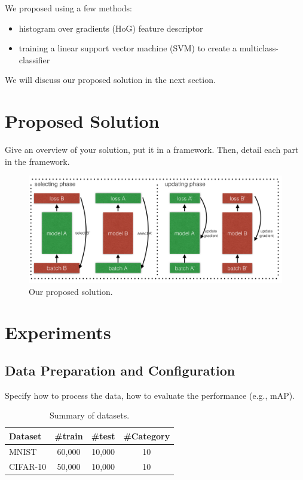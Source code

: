 \documentclass[11pt]{article}
\begin{document}
We proposed using a few methods:

\begin{itemize}
    \item histogram over gradients (HoG) feature descriptor
    \item training a linear support vector machine (SVM) to create a multiclass-classifier
\end{itemize}

We will discuss our proposed solution in the next section.\\


\section{Proposed Solution}
Give an overview of your solution, put it in a framework. Then, detail each part in the framework.

\begin{figure}[ht]
\centering
    \includegraphics[width=14cm]{figures/coteaching.png}
    \caption{Our proposed solution.}
    \label{fig:framework}
\end{figure}


\section{Experiments}
\subsection{Data Preparation and Configuration}

Specify how to process the data, how to evaluate the performance (e.g., mAP).
\begin{table}[ht]
    \centering
    \begin{tabular}{l|c|c|c}
    \hline
     Dataset & \#train & \#test & \#Category\\
    \hline
    MNIST& 60,000 & 10,000 & 10  \\
    CIFAR-10& 50,000 & 10,000 & 10 \\
    \hline
    \end{tabular}
    \caption{Summary of datasets.}
    \label{tab:dataset}
\end{table}
\end{document}
